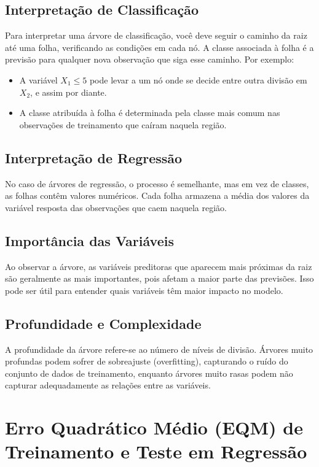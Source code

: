 \documentclass{sciposter}
\begin{document}
\begin{multicols}{3}
\subsection{Interpretação de Classificação}
Para interpretar uma árvore de classificação, você deve seguir o caminho da raiz até uma folha, verificando as condições em cada nó. A classe associada à folha é a previsão para qualquer nova observação que siga esse caminho. Por exemplo:

\begin{itemize}
    \item A variável \(X_1 \leq 5\) pode levar a um nó onde se decide entre outra divisão em \(X_2\), e assim por diante.
    \item A classe atribuída à folha é determinada pela classe mais comum nas observações de treinamento que caíram naquela região.
\end{itemize}

\subsection{Interpretação de Regressão}
No caso de árvores de regressão, o processo é semelhante, mas em vez de classes, as folhas contêm valores numéricos. Cada folha armazena a média dos valores da variável resposta das observações que caem naquela região.

\subsection{Importância das Variáveis}
Ao observar a árvore, as variáveis preditoras que aparecem mais próximas da raiz são geralmente as mais importantes, pois afetam a maior parte das previsões. Isso pode ser útil para entender quais variáveis têm maior impacto no modelo.

\subsection{Profundidade e Complexidade}
A profundidade da árvore refere-se ao número de níveis de divisão. Árvores muito profundas podem sofrer de sobreajuste (overfitting), capturando o ruído do conjunto de dados de treinamento, enquanto árvores muito rasas podem não capturar adequadamente as relações entre as variáveis.

\section{Erro Quadrático Médio (EQM) de Treinamento e Teste em Regressão}


\end{multicols}
\end{document}
